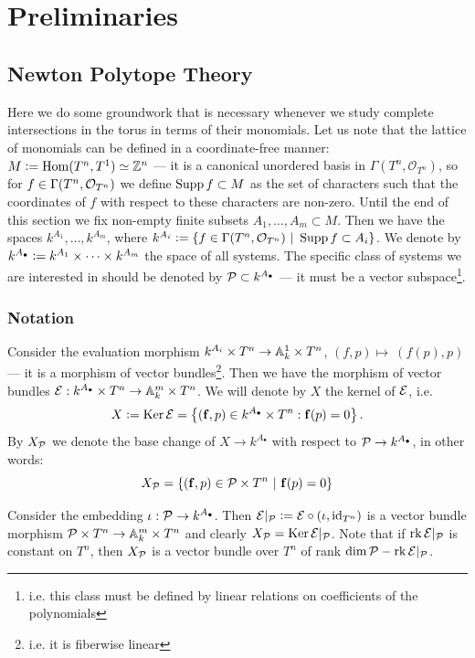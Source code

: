 \section{Preliminaries}\label{sec:preliminaries}
\subsection{Newton Polytope Theory}\label{ssec:prelim_newton}
Here we do some groundwork that is necessary whenever we study complete intersections in the torus in terms of their monomials.
Let us note that the lattice of monomials can be defined in a coordinate-free manner: $M \defeq \Hom(T^n, T^1) \simeq \Z^n$ --- it is a canonical unordered basis in $\Gamma(T^n, \mathcal O_{T^n})$, so for $f \in \Gamma(T^n, \O_{T^n})$ we define $\Supp f \subset M$ as the set of characters such that the coordinates of $f$ with respect to these characters are non-zero. Until the end of this section we fix non-empty finite subsets $A_1, \dots, A_m \subset M$. Then we have the spaces $k^{A_1}, \dots, k^{A_m}$, where $k^{A_i} \defeq \{f \in \Gamma(T^n, \mathcal O_{T^n})\ |\ \Supp f \subset A_i \}$. We denote by $k^{A_\bullet} \defeq k^{A_1} \times \dots \times k^{A_m}$ the space of all systems. The specific class of systems we are interested in should be denoted by $\P \subset k^{A_\bullet}$ --- it must be a vector subspace\footnote{i.e. this class must be defined by linear relations on coefficients of the polynomials}.
\subsubsection{Notation}

\begin{definition}\label{def:evaluation}
    Consider the evaluation morphism $k^{A_i} \times T^n \to \A^1_k \times T^n$, $(f, p) \mapsto~(f(p), p)$ --- it is a morphism of vector bundles\footnote{i.e. it is fiberwise linear}. Then we have the morphism of vector bundles $\E: k^{A_\bullet} \times T^n \to \A_k^m \times T^n$. We will denote by $X$ the kernel of $\E$, i.e.
    \[
    X \defeq \Ker \mathcal E =  \left\{ (\mathbf f, p) \in k^{A_\bullet} \times T^n : \mathbf f(p) = 0 \right\}.
    \]
    By $X_\P$ we denote the base change of $X \to k^{A_\bullet}$ with respect to $\P \to k^{A_\bullet}$, in other words:
    \[
    X_\P = \{ (\mathbf f, p) \in \P \times T^n\ |\ \mathbf f(p) = 0 \}
    \]
\end{definition}

\begin{notation}
    Consider the embedding $\iota : \P \to k^{A_\bullet}$. Then $\E|_\P \defeq \E \circ (\iota, \id_{T^n})$ is a vector bundle morphism $\P \times T^n \to \A^m_k \times T^n$ and clearly $X_\P = \Ker \E|_\P$. Note that if $\rk \E|_\P$ is constant on $T^n$, then $X_\P$ is a vector bundle over $T^n$ of rank $\dim \P - \rk \E|_\P$.
\end{notation}

